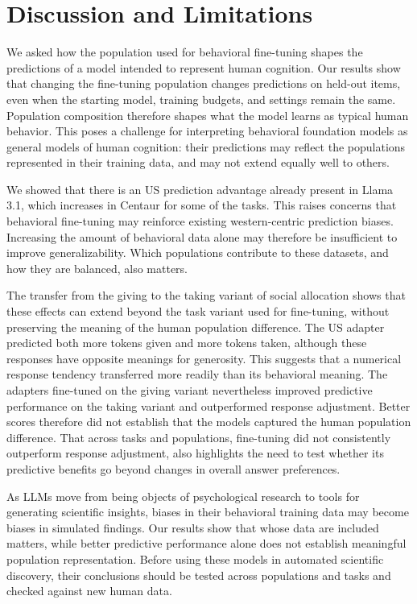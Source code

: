 \section{Discussion and Limitations}
\label{sec:discussion}

We asked how the population used for behavioral fine-tuning shapes the predictions of a model intended to represent human cognition. Our results show that changing the fine-tuning population changes predictions on held-out items, even when the starting model, training budgets, and settings remain the same. Population composition therefore shapes what the model learns as typical human behavior. This poses a challenge for interpreting behavioral foundation models as general models of human cognition: their predictions may reflect the populations represented in their training data, and may not extend equally well to others.

We showed that there is an US prediction advantage already present in Llama 3.1, which increases in Centaur for some of the tasks. This raises concerns that behavioral fine-tuning may reinforce existing western-centric prediction biases. Increasing the amount of behavioral data alone may therefore be insufficient to improve generalizability. Which populations contribute to these datasets, and how they are balanced, also matters.

The transfer from the giving to the taking variant of social allocation shows that these effects can extend beyond the task variant used for fine-tuning, without preserving the meaning of the human population difference. The US adapter predicted both more tokens given and more tokens taken, although these responses have opposite meanings for generosity. This suggests that a numerical response tendency transferred more readily than its behavioral meaning. The adapters fine-tuned on the giving variant nevertheless improved predictive performance on the taking variant and outperformed response adjustment. Better scores therefore did not establish that the models captured the human population difference. That across tasks and populations, fine-tuning did not consistently outperform response adjustment, also highlights the need to test whether its predictive benefits go beyond changes in overall answer preferences.

  As LLMs move from being objects of psychological research to tools for generating scientific insights, biases in their behavioral training data may become biases in simulated findings. Our results show that whose data are included matters, while better predictive performance alone does not establish meaningful population representation. Before using these models in automated scientific discovery, their conclusions should be tested across populations and tasks and checked against new human data.

